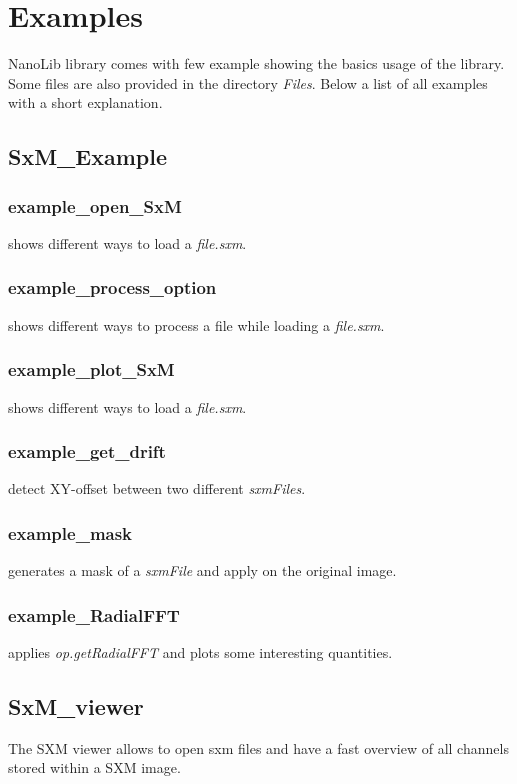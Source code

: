 \section{Examples} 
\label{sec::examples}

NanoLib library comes with few example showing the basics usage of the library. Some files are also provided in the directory \emph{Files}.
Below a list of all examples with a short explanation.
\subsection{SxM\_Example}
\label{sxm::example}

\subsubsection*{example\_open\_SxM} shows different ways to load a \emph{file.sxm}.
\subsubsection*{example\_process\_option} shows different ways to process a file while loading a \emph{file.sxm}.
\subsubsection*{example\_plot\_SxM} shows different ways to load a \emph{file.sxm}.
\subsubsection*{example\_get\_drift} detect XY-offset between two different \emph{sxmFiles}.
\subsubsection*{example\_mask} generates a mask of a \emph{sxmFile} and apply on the original image.
\subsubsection*{example\_RadialFFT} applies \emph{op.getRadialFFT} and plots some interesting quantities.

\subsection{SxM\_viewer}
\label{sxm::viewer}
The SXM viewer allows to open sxm files and have a fast overview of all channels stored within a SXM image.


